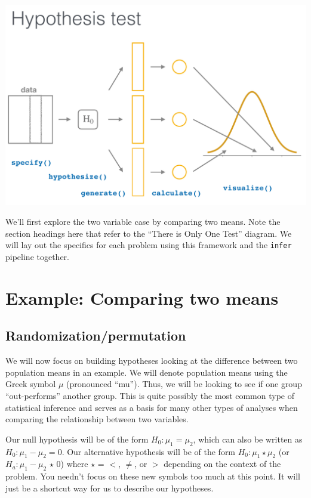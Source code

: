 \documentclass[12pt,]{krantz}
\begin{document}
\begin{center}\includegraphics[width=\textwidth]{images/flowcharts/infer/ht} \end{center}

We'll first explore the two variable case by comparing two means. Note
the section headings here that refer to the ``There is Only One Test''
diagram. We will lay out the specifics for each problem using this
framework and the \texttt{infer} pipeline together.

\section{Example: Comparing two
means}\label{example-comparing-two-means}

\subsection{Randomization/permutation}\label{randomizationpermutation}

We will now focus on building hypotheses looking at the difference
between two population means in an example. We will denote population
means using the Greek symbol \(\mu\) (pronounced ``mu''). Thus, we will
be looking to see if one group ``out-performs'' another group. This is
quite possibly the most common type of statistical inference and serves
as a basis for many other types of analyses when comparing the
relationship between two variables.

Our null hypothesis will be of the form \(H_0: \mu_1 = \mu_2\), which
can also be written as \(H_0: \mu_1 - \mu_2 = 0\). Our alternative
hypothesis will be of the form \(H_0: \mu_1 \star \mu_2\) (or
\(H_a: \mu_1 - \mu_2 \, \star \, 0\)) where \(\star\) = \(<\), \(\ne\),
or \(>\) depending on the context of the problem. You needn't focus on
these new symbols too much at this point. It will just be a shortcut way
for us to describe our hypotheses.
\end{document}

